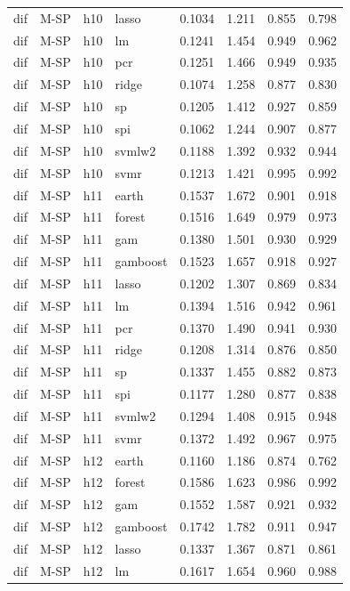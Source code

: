 \begin{ThreePartTable}
\begin{longtable}[t]{llclcccc}
dif & M-SP & h10 & lasso & 0.1034 & 1.211 & 0.855 & 0.798\\
dif & M-SP & h10 & lm & 0.1241 & 1.454 & 0.949 & 0.962\\
dif & M-SP & h10 & pcr & 0.1251 & 1.466 & 0.949 & 0.935\\
dif & M-SP & h10 & ridge & 0.1074 & 1.258 & 0.877 & 0.830\\
dif & M-SP & h10 & sp & 0.1205 & 1.412 & 0.927 & 0.859\\
dif & M-SP & h10 & spi & 0.1062 & 1.244 & 0.907 & 0.877\\
dif & M-SP & h10 & svmlw2 & 0.1188 & 1.392 & 0.932 & 0.944\\
dif & M-SP & h10 & svmr & 0.1213 & 1.421 & 0.995 & 0.992\\
\addlinespace
dif & M-SP & h11 & earth & 0.1537 & 1.672 & 0.901 & 0.918\\
dif & M-SP & h11 & forest & 0.1516 & 1.649 & 0.979 & 0.973\\
dif & M-SP & h11 & gam & 0.1380 & 1.501 & 0.930 & 0.929\\
dif & M-SP & h11 & gamboost & 0.1523 & 1.657 & 0.918 & 0.927\\
dif & M-SP & h11 & lasso & 0.1202 & 1.307 & 0.869 & 0.834\\
dif & M-SP & h11 & lm & 0.1394 & 1.516 & 0.942 & 0.961\\
dif & M-SP & h11 & pcr & 0.1370 & 1.490 & 0.941 & 0.930\\
dif & M-SP & h11 & ridge & 0.1208 & 1.314 & 0.876 & 0.850\\
dif & M-SP & h11 & sp & 0.1337 & 1.455 & 0.882 & 0.873\\
dif & M-SP & h11 & spi & 0.1177 & 1.280 & 0.877 & 0.838\\
dif & M-SP & h11 & svmlw2 & 0.1294 & 1.408 & 0.915 & 0.948\\
dif & M-SP & h11 & svmr & 0.1372 & 1.492 & 0.967 & 0.975\\
\addlinespace
dif & M-SP & h12 & earth & 0.1160 & 1.186 & 0.874 & 0.762\\
dif & M-SP & h12 & forest & 0.1586 & 1.623 & 0.986 & 0.992\\
dif & M-SP & h12 & gam & 0.1552 & 1.587 & 0.921 & 0.932\\
dif & M-SP & h12 & gamboost & 0.1742 & 1.782 & 0.911 & 0.947\\
dif & M-SP & h12 & lasso & 0.1337 & 1.367 & 0.871 & 0.861\\
dif & M-SP & h12 & lm & 0.1617 & 1.654 & 0.960 & 0.988\\

\end{longtable}
\end{ThreePartTable}
